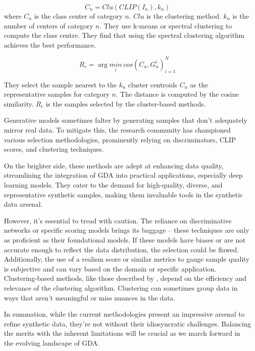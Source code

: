 \documentclass[preprint,12pt,authoryear]{elsarticle}
\begin{document}

\begin{equation}
C_n = Clu(CLIP(I_n),k_n)
\end{equation}
where $C_n$ is the class center of category $n$. $Clu$ is the clustering method. $k_n$ is the number of centers of category $n$. They use k-means or spectral clustering to compute the class centre. They find that using the spectral clustering algorithm achieves the best performance.

\begin{equation}
R_c = \arg \underset{i}{min}\ cos(C_n,G_{n}^{i})_{i=1}^{N}
\end{equation}

They select the sample nearest to the $k_n$ cluster centroids $C_n$ as the representative samples for category $n$. The distance is computed by the cosine similarity. $R_c$ is the samples selected by the cluster-based methods.


Generative models sometimes falter by generating samples that don't adequately mirror real data. To mitigate this, the research community has championed various selection methodologies, prominently relying on discriminators, CLIP scores, and clustering techniques. 

On the brighter side, these methods are adept at enhancing data quality, streamlining the integration of GDA into practical applications, especially deep learning models. They cater to the demand for high-quality, diverse, and representative synthetic samples, making them invaluable tools in the synthetic data arsenal.

However, it's essential to tread with caution. The reliance on discriminative networks or specific scoring models brings its baggage – these techniques are only as proficient as their foundational models. If these models have biases or are not accurate enough to reflect the data distribution, the selection could be flawed. Additionally, the use of a realism score or similar metrics to gauge sample quality is subjective and can vary based on the domain or specific application. Clustering-based methods, like those described by \cite{117_prompt_structure}, depend on the efficiency and relevance of the clustering algorithm. Clustering can sometimes group data in ways that aren't meaningful or miss nuances in the data.

In summation, while the current methodologies present an impressive arsenal to refine synthetic data, they're not without their idiosyncratic challenges. Balancing the merits with the inherent limitations will be crucial as we march forward in the evolving landscape of GDA.
\end{document}

